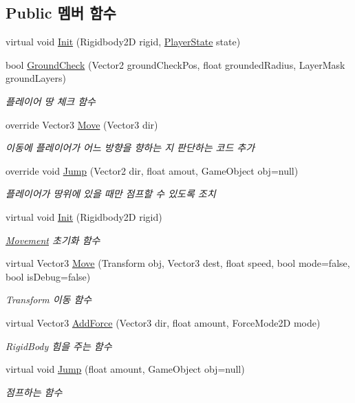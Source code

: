 \subsection*{Public 멤버 함수}
\begin{DoxyCompactItemize}
\item 
virtual void \mbox{\hyperlink{class_player_movement_a104a453051ca7b60d6862e4deb7475b4}{Init}} (Rigidbody2D rigid, \mbox{\hyperlink{class_player_state}{Player\+State}} state)
\item 
bool \mbox{\hyperlink{class_player_movement_a957f2e09268831052dbd00a9e8e4fa70}{Ground\+Check}} (Vector2 ground\+Check\+Pos, float grounded\+Radius, Layer\+Mask ground\+Layers)
\begin{DoxyCompactList}\small\item\em 플레이어 땅 체크 함수 \end{DoxyCompactList}\item 
override Vector3 \mbox{\hyperlink{class_player_movement_a94c480a9aa5629d78b5fd16d9a814bb7}{Move}} (Vector3 dir)
\begin{DoxyCompactList}\small\item\em 이동에 플레이어가 어느 방향을 향하는 지 판단하는 코드 추가 \end{DoxyCompactList}\item 
override void \mbox{\hyperlink{class_player_movement_a64ce92029a6d91f12d23332bdd44a6ab}{Jump}} (Vector2 dir, float amout, Game\+Object obj=null)
\begin{DoxyCompactList}\small\item\em 플레이어가 땅위에 있을 때만 점프할 수 있도록 조치 \end{DoxyCompactList}\item 
virtual void \mbox{\hyperlink{class_movement_a1c50c07edbe274e1cf55253e87506684}{Init}} (Rigidbody2D rigid)
\begin{DoxyCompactList}\small\item\em \mbox{\hyperlink{class_movement}{Movement}} 초기화 함수 \end{DoxyCompactList}\item 
virtual Vector3 \mbox{\hyperlink{class_movement_ad400f155e0556a5e22a74cb77858460a}{Move}} (Transform obj, Vector3 dest, float speed, bool mode=false, bool is\+Debug=false)
\begin{DoxyCompactList}\small\item\em Transform 이동 함수 \end{DoxyCompactList}\item 
virtual Vector3 \mbox{\hyperlink{class_movement_a132e2f7bc0af811ff3b1ab86c8d1f090}{Add\+Force}} (Vector3 dir, float amount, Force\+Mode2D mode)
\begin{DoxyCompactList}\small\item\em Rigid\+Body 힘을 주는 함수 \end{DoxyCompactList}\item 
virtual void \mbox{\hyperlink{class_movement_a656604a80e3c1b86af6b7ce80932442d}{Jump}} (float amount, Game\+Object obj=null)
\begin{DoxyCompactList}\small\item\em 점프하는 함수 \end{DoxyCompactList}\end{DoxyCompactItemize}
